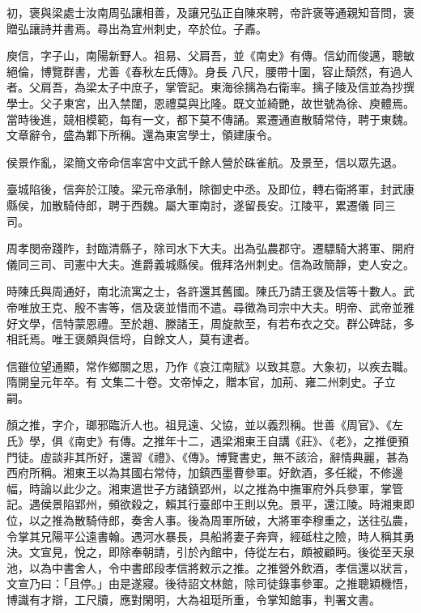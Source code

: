 \begin{pinyinscope}
 初，褒與梁處士汝南周弘讓相善，及讓兄弘正自陳來聘，帝許褒等通親知音問，褒贈弘讓詩并書焉。尋出為宜州刺史，卒於位。子鼒。



 庾信，字子山，南陽新野人。祖易、父肩吾，並《南史》有傳。信幼而俊邁，聰敏絕倫，博覽群書，尤善《春秋左氏傳》。身長
 八尺，腰帶十圍，容止頹然，有過人者。父肩吾，為梁太子中庶子，掌管記。東海徐摛為右衛率。摛子陵及信並為抄撰學士。父子東宮，出入禁闥，恩禮莫與比隆。既文並綺艷，故世號為徐、庾體焉。當時後進，競相模範，每有一文，都下莫不傳誦。累遷通直散騎常侍，聘于東魏。文章辭令，盛為鄴下所稱。還為東宮學士，領建康令。



 侯景作亂，梁簡文帝命信率宮中文武千餘人營於硃雀航。及景至，信以眾先退。



 臺城陷後，信奔於江陵。梁元帝承制，除御史中丞。及即位，轉右衛將軍，封武康縣侯，加散騎侍郎，聘于西魏。屬大軍南討，遂留長安。江陵平，累遷儀
 同三司。



 周孝閔帝踐阼，封臨清縣子，除司水下大夫。出為弘農郡守。遷驃騎大將軍、開府儀同三司、司憲中大夫。進爵義城縣侯。俄拜洛州刺史。信為政簡靜，吏人安之。



 時陳氏與周通好，南北流寓之士，各許還其舊國。陳氏乃請王褒及信等十數人。武帝唯放王克、殷不害等，信及褒並惜而不遣。尋徵為司宗中大夫。明帝、武帝並雅好文學，信特蒙恩禮。至於趙、滕諸王，周旋款至，有若布衣之交。群公碑誌，多相託焉。唯王褒頗與信埒，自餘文人，莫有逮者。



 信雖位望通顯，常作鄉關之思，乃作《哀江南賦》以致其意。大象初，以疾去職。隋開皇元年卒。有
 文集二十卷。文帝悼之，贈本官，加荊、雍二州刺史。子立嗣。



 顏之推，字介，瑯邪臨沂人也。祖見遠、父協，並以義烈稱。世善《周官》、《左氏》學，俱《南史》有傳。之推年十二，遇梁湘東王自講《莊》、《老》，之推便預門徒。虛談非其所好，還習《禮》、《傳》。博覽書史，無不該洽，辭情典麗，甚為西府所稱。湘東王以為其國右常侍，加鎮西墨曹參軍。好飲酒，多任縱，不修邊幅，時論以此少之。湘東遣世子方諸鎮郢州，以之推為中撫軍府外兵參軍，掌管記。遇侯景陷郢州，頻欲殺之，賴其行臺郎中王則以免。景平，還江陵。時湘東即
 位，以之推為散騎侍郎，奏舍人事。後為周軍所破，大將軍李穆重之，送往弘農，令掌其兄陽平公遠書翰。遇河水暴長，具船將妻子奔齊，經砥柱之險，時人稱其勇決。文宣見，悅之，即除奉朝請，引於內館中，侍從左右，頗被顧眄。後從至天泉池，以為中書舍人，令中書郎段孝信將敕示之推。之推營外飲酒，孝信還以狀言，文宣乃曰：「且停。」由是遂寢。後待詔文林館，除司徒錄事參軍。之推聰穎機悟，博識有才辯，工尺牘，應對閑明，大為祖珽所重，令掌知館事，判署文書。




\end{pinyinscope}
